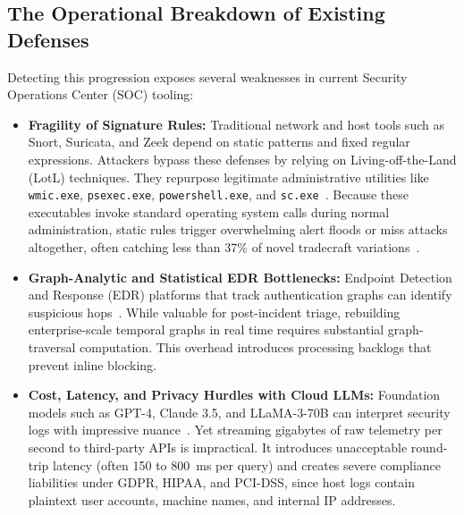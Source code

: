 \documentclass[10pt,journal,compsoc]{IEEEtran}
\begin{document}
\subsection{The Operational Breakdown of Existing Defenses}
Detecting this progression exposes several weaknesses in current Security Operations Center (SOC) tooling:
\begin{itemize}
    \item \textbf{Fragility of Signature Rules:} Traditional network and host tools such as Snort, Suricata, and Zeek depend on static patterns and fixed regular expressions. Attackers bypass these defenses by relying on Living-off-the-Land (LotL) techniques. They repurpose legitimate administrative utilities like \texttt{wmic.exe}, \texttt{psexec.exe}, \texttt{powershell.exe}, and \texttt{sc.exe}~\cite{smiliotopoulos2023}. Because these executables invoke standard operating system calls during normal administration, static rules trigger overwhelming alert floods or miss attacks altogether, often catching less than 37\% of novel tradecraft variations~\cite{carvajal2024}.
    \item \textbf{Graph-Analytic and Statistical EDR Bottlenecks:} Endpoint Detection and Response (EDR) platforms that track authentication graphs can identify suspicious hops~\cite{chen2023, okada2024}. While valuable for post-incident triage, rebuilding enterprise-scale temporal graphs in real time requires substantial graph-traversal computation. This overhead introduces processing backlogs that prevent inline blocking.
    \item \textbf{Cost, Latency, and Privacy Hurdles with Cloud LLMs:} Foundation models such as GPT-4, Claude 3.5, and LLaMA-3-70B can interpret security logs with impressive nuance~\cite{papageorgiou2025, li2025}. Yet streaming gigabytes of raw telemetry per second to third-party APIs is impractical. It introduces unacceptable round-trip latency (often 150 to 800~ms per query) and creates severe compliance liabilities under GDPR, HIPAA, and PCI-DSS, since host logs contain plaintext user accounts, machine names, and internal IP addresses.
\end{itemize}
\end{document}
